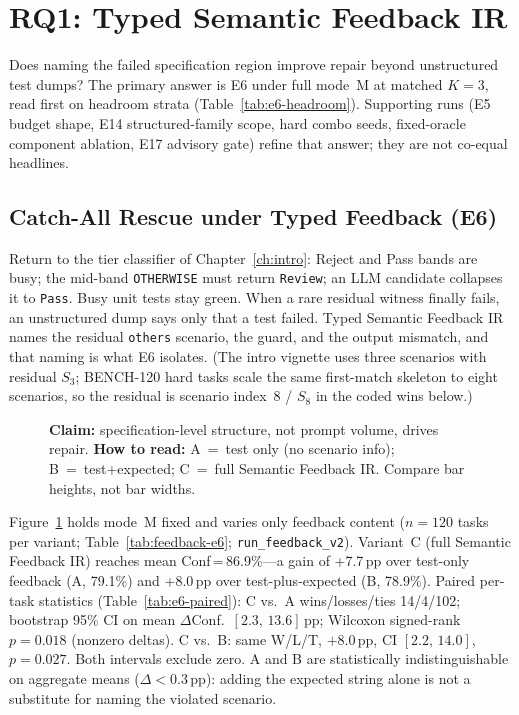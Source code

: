 \section{RQ1: Typed Semantic Feedback IR}
\label{sec:results:rq1}

Does naming the failed specification region improve repair beyond unstructured
test dumps?
The primary answer is E6 under full mode~M at matched $K{=}3$, read first on
headroom strata (Table~\ref{tab:e6-headroom}).
Supporting runs (E5 budget shape, E14 structured-family scope, hard combo
seeds, fixed-oracle component ablation, E17 advisory gate) refine that answer;
they are not co-equal headlines.

\subsection{Catch-All Rescue under Typed Feedback (E6)}
\label{sec:results:e6}

Return to the tier classifier of Chapter~\ref{ch:intro}: Reject and Pass bands
are busy; the mid-band \texttt{OTHERWISE} must return \texttt{Review}; an LLM
candidate collapses it to \texttt{Pass}.
Busy unit tests stay green.
When a rare residual witness finally fails, an unstructured dump says only
that a test failed.
Typed Semantic Feedback IR names the residual \texttt{others} scenario, the
guard, and the output mismatch, and that naming is what E6 isolates.
(The intro vignette uses three scenarios with residual $S_3$; BENCH-120 hard
tasks scale the same first-match skeleton to eight scenarios, so the residual
is scenario index~8 / $S_8$ in the coded wins below.)

\begin{figure}[t]
  \centering
  \caption{\textbf{Claim:} specification-level structure, not prompt volume, drives
    repair.
    \textbf{How to read:} A~=~test only (no scenario info); B~=~test+expected;
    C~=~full Semantic Feedback IR.  Compare bar heights, not bar widths.}
  \label{fig:feedback-variant}
\end{figure}

Figure~\ref{fig:feedback-variant} holds mode~M fixed and varies only feedback
content ($n{=}120$ tasks per variant; Table~\ref{tab:feedback-e6};
\texttt{run\_feedback\_v2}).
Variant~C (full Semantic Feedback IR) reaches mean Conf\,=\,86.9\%---a gain of
+7.7\,pp over test-only feedback (A, 79.1\%) and +8.0\,pp over
test-plus-expected (B, 78.9\%).
Paired per-task statistics (Table~\ref{tab:e6-paired}): C vs.\ A
wins/losses/ties 14/4/102; bootstrap 95\% CI on mean $\Delta$Conf.\ 
$[2.3,\,13.6]$\,pp; Wilcoxon signed-rank $p{=}0.018$ (nonzero deltas).
C vs.\ B: same W/L/T, ${+}8.0$\,pp, CI $[2.2,\,14.0]$, $p{=}0.027$.
Both intervals exclude zero.
A and B are statistically indistinguishable on aggregate means
($\Delta < 0.3$\,pp): adding the expected string alone is not a substitute for
naming the violated scenario.

